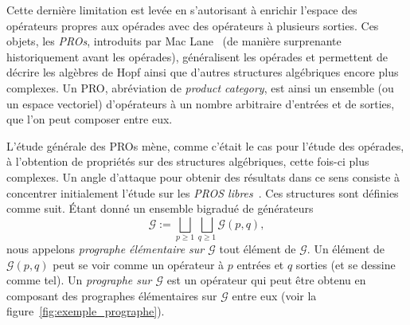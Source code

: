 \documentclass[10pt,reqno]{amsart}
\numberwithin{equation}{subsection}
\renewcommand{\geq}{\geqslant}
\newcommand{\Gen}{\mathcal{G}}
\begin{document}
Cette dernière limitation est levée en s'autorisant à enrichir l'espace
des opérateurs propres aux opérades avec des opérateurs à plusieurs
sorties. Ces objets, les {\em PROs}, introduits par Mac Lane~\cite{McL65}
(de manière surprenante historiquement avant les opérades), généralisent
les opérades et permettent de décrire les algèbres de Hopf ainsi que
d'autres structures algébriques encore plus complexes. Un PRO,
abréviation de {\em product category}, est ainsi un ensemble (ou un
espace vectoriel) d'opérateurs à un nombre arbitraire d'entrées et de
sorties, que l'on peut composer entre eux.

L'étude générale des PROs mène, comme c'était le cas pour l'étude des
opérades, à l'obtention de propriétés sur des structures algébriques,
cette fois-ci plus complexes. Un angle d'attaque pour obtenir des
résultats dans ce sens consiste à concentrer initialement l'étude sur
les {\em PROS libres}~\cite{Laf03,Mar08,BG14}. Ces structures sont
définies comme suit. Étant donné un ensemble bigradué de générateurs
\begin{equation}
    \Gen :=
    \bigsqcup_{p \geq 1} \bigsqcup_{q \geq 1} \Gen(p, q),
\end{equation}
nous appelons {\em prographe élémentaire sur $\Gen$} tout élément de
$\Gen$. Un élément de $\Gen(p, q)$ peut se voir comme un opérateur
à $p$ entrées et $q$ sorties (et se dessine comme tel). Un
{\em prographe sur $\Gen$} est un opérateur qui peut être obtenu en
composant des prographes élémentaires sur $\Gen$ entre eux
(voir la figure~\ref{fig:exemple_prographe}).
\end{document}

